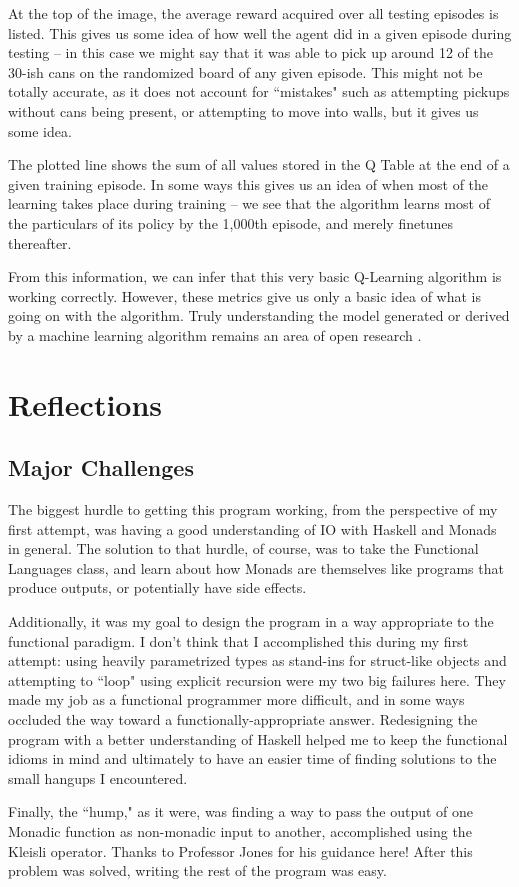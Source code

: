 \documentclass[12pt,a4paper]{article}
\begin{document}
		\par At the top of the image, the average reward acquired over all testing episodes is listed. This gives us some idea of how well the agent did in a given episode during testing -- in this case we might say that it was able to pick up around 12 of the 30-ish cans on the randomized board of any given episode. This might not be totally accurate, as it does not account for ``mistakes" such as attempting pickups without cans being present, or attempting to move into walls, but it gives us some idea.
		\par The plotted line shows the sum of all values stored in the Q Table at the end of a given training episode. In some ways this gives us an idea of when most of the learning takes place during training -- we see that the algorithm learns most of the particulars of its policy by the 1,000th episode, and merely finetunes thereafter. 
			\par From this information, we can infer that this very basic Q-Learning algorithm is working correctly. However, these metrics give us only a basic idea of what is going on with the algorithm. Truly understanding the model generated or derived by a machine learning algorithm remains an area of open research \cite{nguyen}.
			
	\section{Reflections}
	
		\subsection{Major Challenges}
		
		\par The biggest hurdle to getting this program working, from the perspective of my first attempt, was having a good understanding of IO with Haskell and Monads in general. The solution to that hurdle, of course, was to take the Functional Languages class, and learn about how Monads are themselves like programs that produce outputs, or potentially have side effects. 
		\par Additionally, it was my goal to design the program in a way appropriate to the functional paradigm. I don't think that I accomplished this during my first attempt: using heavily parametrized types as stand-ins for struct-like objects and attempting to ``loop" using explicit recursion were my two big failures here. They made my job as a functional programmer more difficult, and in some ways occluded the way toward a functionally-appropriate answer. Redesigning the program with a better understanding of Haskell helped me to keep the functional idioms in mind and ultimately to have an easier time of finding solutions to the small hangups I encountered.
		\par Finally, the ``hump," as it were, was finding a way to pass the output of one Monadic function as non-monadic input to another, accomplished using the Kleisli operator. Thanks to Professor Jones for his guidance here! After this problem was solved, writing the rest of the program was easy.
		
\end{document}
